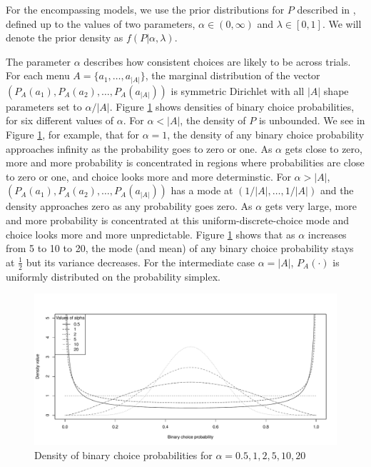 \documentclass[11pt,letter]{article}
\newcommand{\menu}{menu}
\begin{document}
For the encompassing models, we use the prior distributions for $P$ described in , defined up to the values of two parameters, $\alpha \in (0,\infty)$ and $\lambda \in [0,1]$.
We will denote the prior density as $f(P|\alpha,\lambda)$.

The parameter $\alpha$ describes how consistent choices are likely to be across trials.
For each \menu{} $A = \{a_1,\ldots,a_{|A|}\}$, the marginal distribution of the vector $(P_A(a_1), P_A(a_2), \ldots, P_A(a_{|A|}))$ is symmetric Dirichlet with all $|A|$ shape parameters set to $\alpha / |A|$.
Figure \ref{f:bcp} shows densities of binary choice probabilities, for six different values of $\alpha$.
For $\alpha < |A|$, the density of $P$ is unbounded.
We see in Figure \ref{f:bcp}, for example, that for $\alpha = 1$, the density of any binary choice probability approaches infinity as the probability goes to zero or one.
As $\alpha$ gets close to zero, more and more probability is concentrated in regions where probabilities are close to zero or one, and choice looks more and more determinstic.
For $\alpha > |A|$, $(P_A(a_1), P_A(a_2), \ldots, P_A(a_{|A|}))$ has a mode at $(1/|A|, \ldots, 1/|A|)$ and the density approaches zero as any probability goes zero.
As $\alpha$ gets very large, more and more probability is concentrated at this uniform-discrete-choice mode and choice looks more and more unpredictable.
Figure \ref{f:bcp} shows that as $\alpha$ increases from 5 to 10 to 20, the mode (and mean) of any binary choice probability stays at $\tfrac{1}{2}$ but its variance decreases.
For the intermediate case $\alpha = |A|$, $P_A(\cdot)$ is uniformly distributed on the probability simplex.

\begin{figure}
	\begin{center}
	\includegraphics[width=15cm]{bcp.pdf}
	\caption{Density of binary choice probabilities for $\alpha = 0.5, 1, 2, 5, 10, 20$}\label{f:bcp}
	\end{center}
\end{figure}
\end{document}
